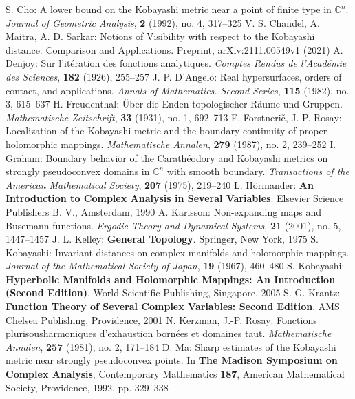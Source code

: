 \begin{thebibliography}{widest entry}
   S. Cho: A lower bound on the Kobayashi metric near a point of finite type in $\mathbb{C}^n$. \textit{Journal of Geometric Analysis}, \textbf{2} (1992), no. 4, 317--325
   V. S. Chandel, A. Maitra, A. D. Sarkar: Notions of Visibility with respect to the Kobayashi distance: Comparison and Applications. Preprint, arXiv:2111.00549v1 (2021)
   A. Denjoy: Sur l'itération des fonctions analytiques. \textit{Comptes Rendus de l'Académie des Sciences}, \textbf{182} (1926), 255--257
   J. P. D'Angelo: Real hypersurfaces, orders of contact, and applications. \textit{Annals of Mathematics. Second Series}, \textbf{115} (1982), no. 3, 615--637
   H. Freudenthal: Über die Enden topologischer Räume und Gruppen. \textit{Mathematische Zeitschrift}, \textbf{33} (1931), no. 1, 692--713
   F. Forstnerič, J.-P. Rosay: Localization of the Kobayashi metric and the boundary continuity of proper holomorphic mappings. \textit{Mathematische Annalen}, \textbf{279} (1987), no. 2, 239--252
   I. Graham: Boundary behavior of the Carathéodory and Kobayashi metrics on strongly pseudoconvex domains in $\mathbb{C}^n$ with smooth boundary. \textit{Transactions of the American Mathematical Society}, \textbf{207} (1975), 219--240
   L. Hörmander: \textbf{An Introduction to Complex Analysis in Several Variables}. Elsevier Science Publishers B. V., Amsterdam, 1990
   A. Karlsson: Non-expanding maps and Busemann functions. \textit{Ergodic Theory and Dynamical Systems}, \textbf{21} (2001), no. 5, 1447--1457
   J. L. Kelley: \textbf{General Topology}. Springer, New York, 1975
   S. Kobayashi: Invariant distances on complex manifolds and holomorphic mappings. \textit{Journal of the Mathematical Society of Japan}, \textbf{19} (1967), 460--480
   S. Kobayashi: \textbf{Hyperbolic Manifolds and Holomorphic Mappings: An Introduction (Second Edition)}. World Scientific Publishing, Singapore, 2005
   S. G. Krantz: \textbf{Function Theory of Several Complex Variables: Second Edition}. AMS Chelsea Publishing, Providence, 2001
   N. Kerzman, J.-P. Rosay: Fonctions plurisousharmoniques d'exhaustion bornées et domaines taut. \textit{Mathematische Annalen}, \textbf{257} (1981), no. 2, 171--184
   D. Ma: Sharp estimates of the Kobayashi metric near strongly pseudoconvex points. In \textbf{The Madison Symposium on Complex Analysis}, Contemporary Mathematics \textbf{187}, American Mathematical Society, Providence, 1992, pp. 329--338

\end{thebibliography}
